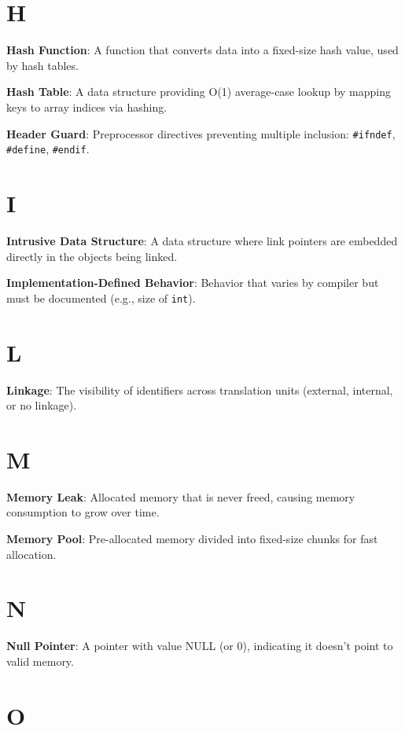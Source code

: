\documentclass[11pt,openany]{book}
\begin{document}
\section*{H}

\textbf{Hash Function}: A function that converts data into a fixed-size hash value, used by hash tables.

\textbf{Hash Table}: A data structure providing O(1) average-case lookup by mapping keys to array indices via hashing.

\textbf{Header Guard}: Preprocessor directives preventing multiple inclusion: \texttt{\#ifndef}, \texttt{\#define}, \texttt{\#endif}.

\section*{I}

\textbf{Intrusive Data Structure}: A data structure where link pointers are embedded directly in the objects being linked.

\textbf{Implementation-Defined Behavior}: Behavior that varies by compiler but must be documented (e.g., size of \texttt{int}).

\section*{L}

\textbf{Linkage}: The visibility of identifiers across translation units (external, internal, or no linkage).

\section*{M}

\textbf{Memory Leak}: Allocated memory that is never freed, causing memory consumption to grow over time.

\textbf{Memory Pool}: Pre-allocated memory divided into fixed-size chunks for fast allocation.

\section*{N}

\textbf{Null Pointer}: A pointer with value NULL (or 0), indicating it doesn't point to valid memory.

\section*{O}
\end{document}
